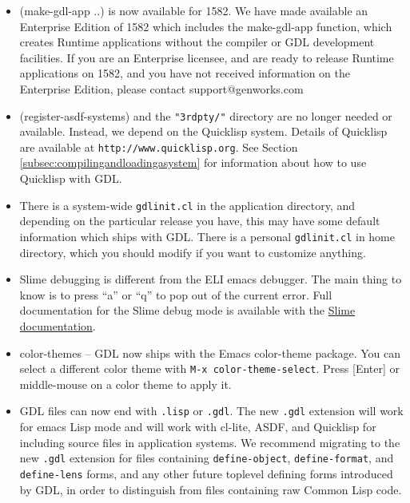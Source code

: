 \documentclass [11pt]{book}
\begin{document}
\begin{itemize}

\item (make-gdl-app ..) is now available for 1582. We have
made available an Enterprise Edition of 1582 which includes the
make-gdl-app function, which creates Runtime applications without the
compiler or GDL development facilities.  If you are an Enterprise
licensee, and are ready to release Runtime applications on 1582, and
you have not received information on the Enterprise Edition, please
contact support@genworks.com

\item (register-asdf-systems) and the \texttt{"3rdpty/"} directory are no longer needed or available. Instead, we depend on the Quicklisp
system. Details of Quicklisp are available at \texttt{http://www.quicklisp.org}. See Section 
\ref{subsec:compilingandloadingasystem} for information about how to use Quicklisp with GDL.

\item There is a system-wide \texttt{gdlinit.cl} in the application directory, and depending on the
       particular release you have, this may have some default
       information which ships with GDL. There is a personal \texttt{gdlinit.cl} in home directory, which you should modify if you want to
       customize anything.

\item Slime debugging is different from the ELI emacs debugger. The main thing to know is 
to press ``a'' or ``q'' to pop out of the current error. Full documentation for the Slime debug mode
is available with the \href{http://common-lisp.net/project/slime/doc/html/Debugger.html}{Slime documentation}.

\item color-themes -- GDL now ships with the Emacs
       color-theme package. You can select a different color theme with \texttt{M-x color-theme-select}. Press [Enter] or middle-mouse on a color theme to apply it.

\item GDL files can now end with \texttt{.lisp} or \texttt{.gdl}. The new \texttt{.gdl} extension will work for emacs Lisp mode and will work with
	 cl-lite, ASDF, and Quicklisp for including source files in application systems. We recommend migrating
to the new \texttt{.gdl} extension for files containing \texttt{define-object}, \texttt{define-format}, and \texttt{define-lens} forms, and any other future toplevel defining forms introduced by GDL, in order to distinguish 
from files containing raw Common Lisp code.


\end{itemize}
\end{document}
